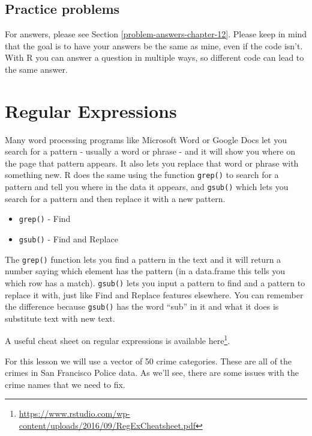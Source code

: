 \documentclass[
]{krantz}
\providecommand{\tightlist}{%
  \setlength{\itemsep}{0pt}\setlength{\parskip}{0pt}}
\renewcommand{\href}[2]{#2\footnote{\url{#1}}}
\begin{document}
\hypertarget{practice-problems-5}{%
\section{Practice problems}\label{practice-problems-5}}

For answers, please see Section \ref{problem-answers-chapter-12}. Please keep in mind that the goal is to have your answers be the same as mine, even if the code isn't. With R you can answer a question in multiple ways, so different code can lead to the same answer.

\hypertarget{regular-expressions}{%
\chapter{Regular Expressions}\label{regular-expressions}}

Many word processing programs like Microsoft Word or Google Docs let you search for a pattern - usually a word or phrase - and it will show you where on the page that pattern appears. It also lets you replace that word or phrase with something new. R does the same using the function \texttt{grep()} to search for a pattern and tell you where in the data it appears, and \texttt{gsub()} which lets you search for a pattern and then replace it with a new pattern.

\begin{itemize}
\tightlist
\item
  \texttt{grep()} - Find
\item
  \texttt{gsub()} - Find and Replace
\end{itemize}

The \texttt{grep()} function lets you find a pattern in the text and it will return a number saying which element has the pattern (in a data.frame this tells you which row has a match). \texttt{gsub()} lets you input a pattern to find and a pattern to replace it with, just like Find and Replace features elsewhere. You can remember the difference because \texttt{gsub()} has the word ``sub'' in it and what it does is substitute text with new text.

A useful cheat sheet on regular expressions is available \href{https://www.rstudio.com/wp-content/uploads/2016/09/RegExCheatsheet.pdf}{here}.

For this lesson we will use a vector of 50 crime categories. These are all of the crimes in San Francisco Police data. As we'll see, there are some issues with the crime names that we need to fix.
\end{document}
